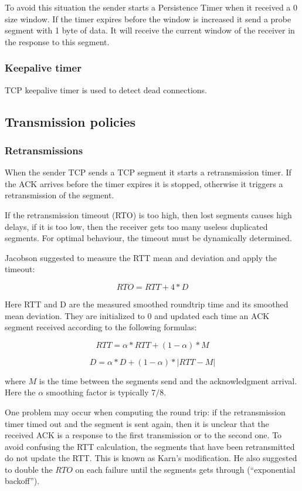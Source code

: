 To avoid this situation the sender starts a Persistence Timer when it received
a 0 size window. If the timer expires before the window is increased it send
a probe segment with 1 byte of data. It will receive the current window of the
receiver in the response to this segment.

\subsubsection*{Keepalive timer}

TCP keepalive timer is used to detect dead connections.

\subsection{Transmission policies}

\subsubsection*{Retransmissions}


When the sender TCP sends a TCP segment it starts a
retransmission timer.
If the ACK arrives before the timer expires it is stopped,
otherwise it triggers a retransmission of the segment.

If the retransmission timeout (RTO) is too high, then lost segments
causes high delays, if it is too low, then the receiver gets
too many useless duplicated segments. For optimal behaviour, the
timeout must be dynamically determined.

Jacobson suggested to measure the RTT mean and deviation
and apply the timeout:

$$ RTO = RTT + 4 * D $$

Here RTT and D are the measured smoothed roundtrip time and its
smoothed mean deviation. They are initialized to 0 and updated each time an
ACK segment received according to the following formulas:

$$ RTT = \alpha*RTT + (1-\alpha) * M $$

$$ D = \alpha*D + (1-\alpha)*|RTT-M| $$

where $M$ is the time between the segments send and the acknowledgment
arrival. Here the $\alpha$ smoothing factor is typically $7/8$.

One problem may occur when computing the round trip: if the
retransmission timer timed out and the segment is sent again,
then it is unclear that the received ACK is a response to the
first transmission or to the second one. To avoid confusing the
RTT calculation, the segments that have been retransmitted
do not update the RTT. This is known as Karn's modification.
He also suggested to double the $RTO$ on each failure until the
segments gets through (``exponential backoff'').

